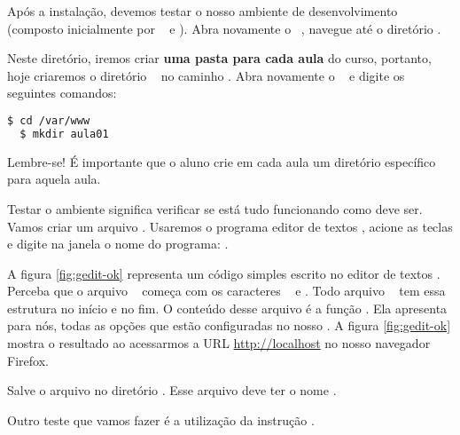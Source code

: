 Após a instalação, devemos testar o nosso ambiente de desenvolvimento (composto
inicialmente por \php~ e \apache). Abra novamente o \terminal~, navegue até o
diretório \dirpadrao.

Neste diretório, iremos criar \textbf{uma pasta para cada aula} do curso, portanto, hoje
criaremos o diretório ~ no caminho \dirpadrao. Abra novamente o \terminal~
e digite os seguintes comandos:

\begin{lstlisting}[language=bash]
  $ cd /var/www 
  $ mkdir aula01
\end{lstlisting}

Lembre-se! É importante que o aluno crie em cada aula um diretório 
específico para aquela aula.

Testar o ambiente significa verificar se está tudo funcionando como deve ser. Vamos criar um 
arquivo \phpextensao. Usaremos o programa editor de textos \gedit, acione as teclas \altfdois 
e digite na janela o nome do programa: \gedit. 

A figura \ref{fig:gedit-ok} representa um código simples escrito no editor de textos \gedit. 
Perceba que o arquivo \phpextensao~ começa com os caracteres \phpinicio~ e \phpfim. 
Todo arquivo \phpextensao~ tem essa estrutura no início e no fim. O conteúdo desse arquivo é 
a função \funcaophpinfo. Ela apresenta para nós, todas as opções que estão configuradas no 
nosso \php. A figura \ref{fig:gedit-ok} mostra o resultado ao acessarmos a URL \url{http://localhost} 
no nosso navegador Firefox.

Salve o arquivo no diretório . Esse arquivo deve ter o nome .


Outro teste que vamos fazer é a utilização da instrução \funcaoecho.

